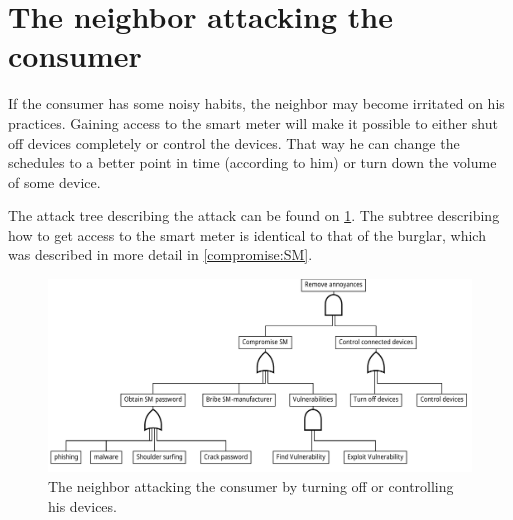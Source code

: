 \section{The neighbor attacking the consumer}

If the consumer has some noisy habits, the neighbor may become irritated on his practices.
Gaining access to the smart meter will make it possible to either shut off devices completely or control the devices.
That way he can change the schedules to a better point in time (according to him) or turn down the volume of some device.

The attack tree describing the attack can be found on \cref{fig:attack_trees:neighbor}.
The subtree describing how to get access to the smart meter is identical to that of the burglar, which was described in more detail in \cref{compromise:SM}.

\begin{figure}[h]
  \centering
	\includegraphics[width=\textwidth]{figures/graphviz/neighbor_vs_consumer.pdf}
	\caption{The neighbor attacking the consumer by turning off or controlling his devices.}
	\label{fig:attack_trees:neighbor}
\end{figure}